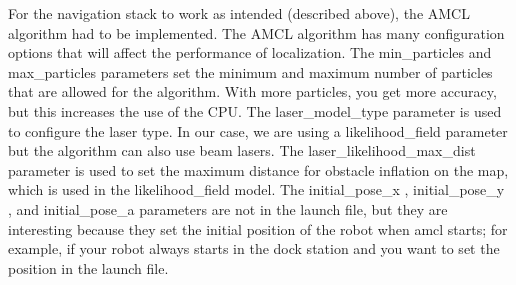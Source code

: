     For the navigation stack to work as intended (described above), the AMCL algorithm had to be implemented. The	AMCL algorithm has many configuration options that will affect the performance of localization. The	 min_particles 	and	 max_particles 	parameters	set	the	minimum	and	maximum	number
    of	particles	that	are	allowed	for	the	algorithm.	With	more	particles,	you	get	more	accuracy,
    but	this	increases	the	use	of	the	CPU.
    The	 laser_model_type 	parameter	is	used	to	configure	the	laser	type.	In	our	case,	we	are	using
    a	 likelihood_field 	parameter	but	the	algorithm	can	also	use	beam	lasers.
    The	 laser_likelihood_max_dist 	parameter	is	used	to	set	the	maximum	distance	for	obstacle
    inflation	on	the	map,	which	is	used	in	the	 likelihood_field 	model.
    The	 initial_pose_x ,	 initial_pose_y ,	and	 initial_pose_a 	parameters	are	not	in	the	launch
    file,	but	they	are	interesting	because	they	set	the	initial	position	of	the	robot	when	 amcl 	starts;
    for	example,	if	your	robot	always	starts	in	the	dock	station	and	you	want	to	set	the	position	in
    the	launch	file.